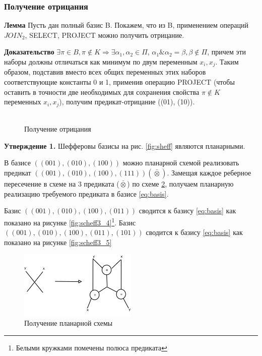 \documentclass[12pt]{article}
\begin{document}
\subsubsection{Получение отрицания}
\textbf{Лемма}
Пусть дан полный базис B. Покажем, что из B, применением операций $JOIN_2$, SELECT, PROJECT можно получить отрицание.

\textbf{Доказательство} $\exists \pi \in B, \pi \notin K \Rightarrow \exists \alpha_1, \alpha_2 \in \Pi$,
$\alpha_1\&\alpha_2=\beta, \beta \notin \Pi$, причем эти наборы должны отличаться как минимум по двум переменным $x_i, x_{j}$.
Таким образом, подставив вместо всех общих переменных этих наборов соответствующие константы 0 и 1, применив операцию PROJECT
(чтобы оставить в точности две необходимых для сохранения свойства $\pi \notin K$ переменных $x_i, x_j$), 
получим предикат-отрицание ((01), (10)).
\begin{figure}[htb]
\centering
\includegraphics[width=0.01\textwidth]{3_2to3.png}
\caption{Получение отрицания}
\label{fig:negation}
\end{figure}

\textbf{Утверждение 1.} Шефферовы базисы на рис. \ref{fig:sheff} являются планарными.

В базисе $((001), (010), (100))$ \label{eq:basis} можно планарной схемой реализовать предикат 
$((001), (010), (100), (111)) (\bar{\otimes})$. Замещая каждое реберное пересечение в схеме на 
3 предиката ($\bar{\otimes}$) по схеме \ref{fig:xor}, получаем планарную реализацию требуемого предиката
в базисе \ref{eq:basis}.

Базис $((001), (010), (100), (011))$ сводится к базису \ref{eq:basis} как показано на рисунке 
\ref{fig:scheff3_4}\footnote{Белыми кружками помечены полюса предиката}.
Базис $((001), (010), (100), (011), (101))$ сводится к базису \ref{eq:basis} как показано на рисунке \ref{fig:scheff3_5}

\begin{figure}[htb]
\centering
\includegraphics[width=0.5\textwidth]{intersection.png}
\caption{Получение планарной схемы}
\label{fig:xor}
\end{figure}
\end{document}
